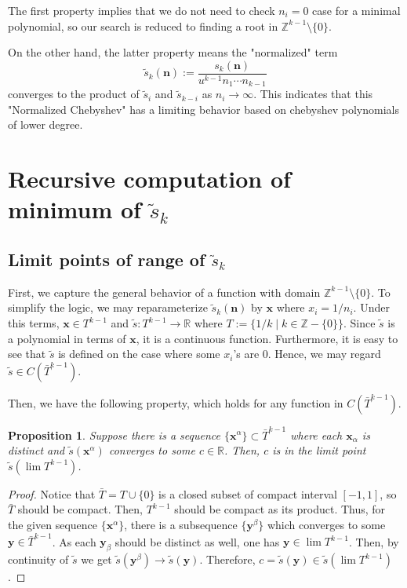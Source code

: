\documentclass{article}
\theoremstyle{definition}
\theoremstyle{plain}
\newtheorem{proposition}{Proposition}[section]
\theoremstyle{remark}
\numberwithin{equation}{section}
\newcommand{\integer}{\mathbb{Z}}
\newcommand{\real}{\mathbb{R}}
\begin{document}
The first property implies that we do not need to check $n_i = 0$ case for a minimal polynomial,
so our search is reduced to finding a root in $\integer^{k-1} \setminus \{0\}$.

On the other hand, the latter property means the "normalized" term
\[
  \tilde{s}_k(\mathbf{n}) := \frac{s_k(\mathbf{n})}{u^{k-1} n_1 \cdots n_{k-1}}
\]
converges to the product of $\tilde{s}_i$ and $\tilde{s}_{k-i}$ as $n_i \to \infty$.
This indicates that this "Normalized Chebyshev" has a limiting behavior
based on chebyshev polynomials of lower degree.

\section{Recursive computation of minimum of $\tilde{s}_k$}

\subsection{Limit points of range of $\tilde{s}_k$}

First, we capture the general behavior of a function with domain $\integer^{k-1} \setminus \{0\}$.
To simplify the logic, we may reparameterize $\tilde{s}_k(\mathbf{n})$
by $\mathbf{x}$ where $x_i = 1 / n_i$.
Under this terms, $\mathbf{x} \in T^{k-1}$ and $\tilde{s} : T^{k-1} \to \real$
where $T := \{ 1 / k \mid k \in \integer - \{ 0 \} \}$.
Since $\tilde{s}$ is a polynomial in terms of $\mathbf{x}$,
it is a continuous function.
Furthermore, it is easy to see that $\tilde{s}$ is defined on the case where some $x_i$'s are 0.
Hence, we may regard $\tilde{s} \in C(\bar{T}^{k-1})$.

Then, we have the following property, which holds for any function in $C(\bar{T}^{k-1})$.
\begin{proposition}
  Suppose there is a sequence $\{ \mathbf{x}^\alpha \} \subset \bar{T}^{k-1}$
  where each $\mathbf{x}_\alpha$ is distinct
  and $\tilde{s}(\mathbf{x}^\alpha)$ converges to some $c \in \real$.
  Then, $c$ is in the limit point $\tilde{s}(\lim T^{k-1})$.
\end{proposition}
\begin{proof}
  Notice that $\bar{T} = T \cup \{ 0 \}$ is a closed subset of compact interval $[-1, 1]$,
  so $\bar{T}$ should be compact. Then, $T^{k-1}$ should be compact as its product.
  Thus, for the given sequence $\{ \mathbf{x}^\alpha \}$,
  there is a subsequence $\{ \mathbf{y}^\beta \}$ which converges to some $\mathbf{y} \in \bar{T}^{k-1}$.
  As each $\mathbf{y}_\beta$ should be distinct as well, one has $\mathbf{y} \in \lim T^{k-1}$.
  Then, by continuity of $\tilde{s}$ we get $\tilde{s}(\mathbf{y}^\beta) \to \tilde{s}(\mathbf{y})$.
  Therefore, $c = \tilde{s}(\mathbf{y}) \in \tilde{s}(\lim T^{k-1})$.
\end{proof}
\end{document}
